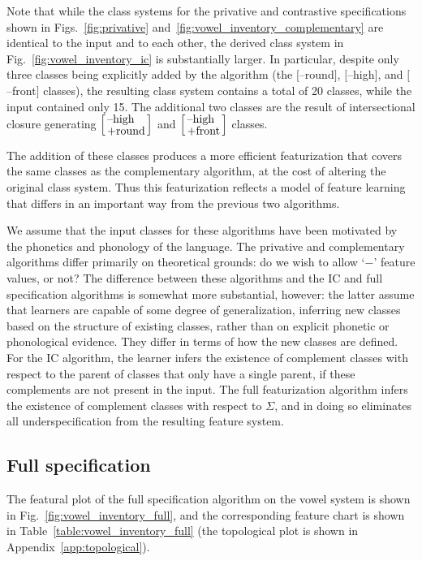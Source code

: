 \documentclass[12pt, oneside]{article}   	%
\newcommand{\featmat}[1]
{$[$#1$]$}
\newcommand{\featmattwo}[2]{$\begin{bsmallmatrix*}[l]\text{\normalsize #1}\\\text{\normalsize #2}\end{bsmallmatrix*}$}
\begin{document}
Note that while the class systems for the privative and contrastive specifications shown in Figs.~\ref{fig:privative} and~\ref{fig:vowel_inventory_complementary} are identical to the input and to each other, the derived class system in Fig.~\ref{fig:vowel_inventory_ic} is substantially larger. In particular, despite only three classes being explicitly added by the algorithm (the \featmat{--round}, \featmat{--high}, and \featmat{--front} classes), the resulting class system contains a total of 20 classes, while the input contained only 15. The additional two classes are the result of intersectional closure generating \featmattwo{--high}{+round} and \featmattwo{--high}{+front} classes.

The addition of these classes produces a more efficient featurization that covers the same classes as the complementary algorithm, at the cost of altering the original class system. Thus this featurization reflects a model of feature learning that differs in an important way from the previous two algorithms.

We assume that the input classes for these algorithms have been motivated by the phonetics and phonology of the language. The privative and complementary algorithms differ primarily on theoretical grounds: do we wish to allow `$-$' feature values, or not? The difference between these algorithms and the IC and full specification algorithms is somewhat more substantial, however: the latter assume that learners are capable of some degree of generalization, inferring new classes based on the structure of existing classes, rather than on explicit phonetic or phonological evidence. They differ in terms of how the new classes are defined. For the IC algorithm, the learner infers the existence of complement classes with respect to the parent of classes that only have a single parent, if these complements are not present in the input. The full featurization algorithm infers the existence of complement classes with respect to $\Sigma$, and in doing so eliminates all underspecification from the resulting feature system.

\subsection{Full specification}

The featural plot of the full specification algorithm on the vowel system is shown in Fig.~\ref{fig:vowel_inventory_full}, and the corresponding feature chart is shown in Table~\ref{table:vowel_inventory_full} (the topological plot is shown in Appendix~\ref{app:topological}).
\end{document}
